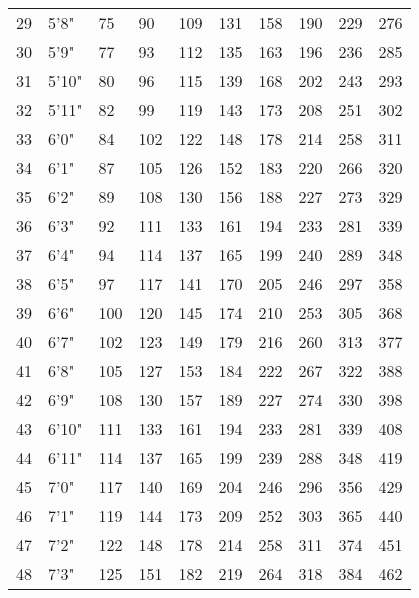\begin{tcolorbox}[breakable,boxrule=0pt]
\begin{tabular}{l l l l l l l l l l}
29 & 5'8" & 75 & 90 & 109 & 131 & 158 & 190 & 229 & 276\\
30 & 5'9" & 77 & 93 & 112 & 135 & 163 & 196 & 236 & 285\\
31 & 5'10" & 80 & 96 & 115 & 139 & 168 & 202 & 243 & 293\\
32 & 5'11" & 82 & 99 & 119 & 143 & 173 & 208 & 251 & 302\\
33 & 6'0" & 84 & 102 & 122 & 148 & 178 & 214 & 258 & 311\\
34 & 6'1" & 87 & 105 & 126 & 152 & 183 & 220 & 266 & 320\\
35 & 6'2" & 89 & 108 & 130 & 156 & 188 & 227 & 273 & 329\\
36 & 6'3" & 92 & 111 & 133 & 161 & 194 & 233 & 281 & 339\\
37 & 6'4" & 94 & 114 & 137 & 165 & 199 & 240 & 289 & 348\\
38 & 6'5" & 97 & 117 & 141 & 170 & 205 & 246 & 297 & 358\\
39 & 6'6" & 100 & 120 & 145 & 174 & 210 & 253 & 305 & 368\\
40 & 6'7" & 102 & 123 & 149 & 179 & 216 & 260 & 313 & 377\\
41 & 6'8" & 105 & 127 & 153 & 184 & 222 & 267 & 322 & 388\\
42 & 6'9" & 108 & 130 & 157 & 189 & 227 & 274 & 330 & 398\\
43 & 6'10" & 111 & 133 & 161 & 194 & 233 & 281 & 339 & 408\\
44 & 6'11" & 114 & 137 & 165 & 199 & 239 & 288 & 348 & 419\\
45 & 7'0" & 117 & 140 & 169 & 204 & 246 & 296 & 356 & 429\\
46 & 7'1" & 119 & 144 & 173 & 209 & 252 & 303 & 365 & 440\\
47 & 7'2" & 122 & 148 & 178 & 214 & 258 & 311 & 374 & 451\\
48 & 7'3" & 125 & 151 & 182 & 219 & 264 & 318 & 384 & 462\\
\end{tabular}
\end{tcolorbox}
\pagebreak
